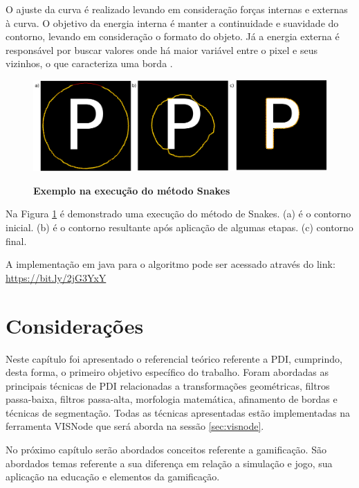 \documentclass[
	12pt,				%
	oneside,			%
	a4paper,			%
	english,			%
	french,				%
	spanish,			%
	brazil,				%
	]{abntex2}
\begin{document}
O ajuste da curva é realizado levando em consideração forças internas e externas à curva. O objetivo da energia interna é manter a continuidade e suavidade do contorno, levando em consideração o formato do objeto. Já a energia externa é responsável por buscar valores onde há maior variável entre o pixel e seus vizinhos, o que caracteriza uma borda \cite{kass:1988}.

\begin{figure}[ht]
\centering
\caption{\textbf{Exemplo na execução do método Snakes}}
\includegraphics[width=1\textwidth]{imagens/snake.png}
\sourceAuthor
\label{fig:snake}
\end{figure}

\citet{de2013classroom}

Na Figura \ref{fig:snake} é demonstrado uma execução do método de Snakes. (a) é o contorno inicial. (b) é o contorno resultante após aplicação de algumas etapas. (c) contorno final.

A implementação em java para o algoritmo pode ser acessado através do link: \url{https://bit.ly/2jG3YxY}

\section{Considerações}

Neste capítulo foi apresentado o referencial teórico referente a PDI, cumprindo, desta forma, o primeiro objetivo específico do trabalho. Foram abordadas as principais técnicas de PDI relacionadas a transformações geométricas, filtros passa-baixa, filtros passa-alta, morfologia matemática, afinamento de bordas e técnicas de segmentação. Todas as técnicas apresentadas estão implementadas na ferramenta VISNode que será aborda na sessão \ref{sec:visnode}.

No próximo capítulo serão abordados conceitos referente a gamificação. São abordados temas referente a sua diferença em relação a simulação e jogo, sua aplicação na educação e elementos da gamificação.

\end{document}
